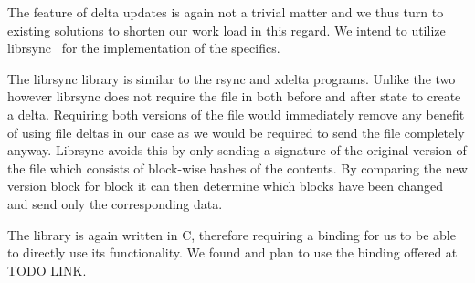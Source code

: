 The feature of delta updates is again not a trivial matter and we thus turn to existing solutions to shorten our work load in this regard.
We intend to utilize librsync~\cite{web:site:librsync} for the implementation of the specifics.

The librsync library is similar to the rsync and xdelta programs.
Unlike the two however librsync does not require the file in both before and after state to create a delta.
Requiring both versions of the file would immediately remove any benefit of using file deltas in our case as we would be required to send the file completely anyway.
Librsync avoids this by only sending a signature of the original version of the file which consists of block-wise hashes of the contents.
By comparing the new version block for block it can then determine which blocks have been changed and send only the corresponding data.

The library is again written in C, therefore requiring a binding for us to be able to directly use its functionality.
We found and plan to use the binding offered at TODO LINK.
